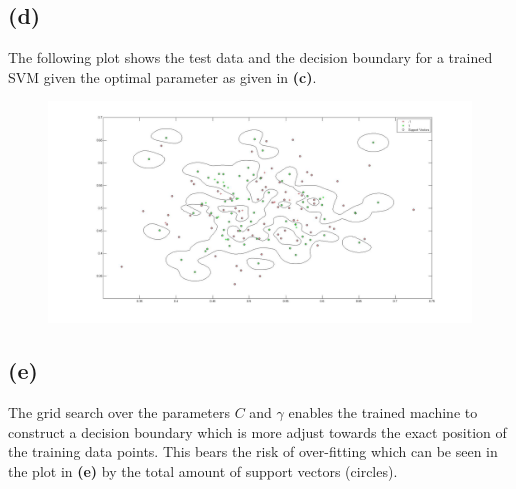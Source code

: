 \documentclass[11pt,a4paper]{article}
\begin{document}
\subsection*{(d)}
The following plot shows the test data and the decision boundary for a trained SVM given the optimal parameter as given in \textbf{(c)}.
\begin{figure}[h]
	\includegraphics[width=\linewidth]{test_dat_model.jpg}
\end{figure}

\subsection*{(e)}
The grid search over the parameters $C$ and $\gamma$ enables the trained machine to construct a decision boundary which is more adjust towards the exact position of the training data points. This bears the risk of over-fitting which can be seen in the plot in \textbf{(e)} by the total amount of support vectors (circles).
\end{document}
